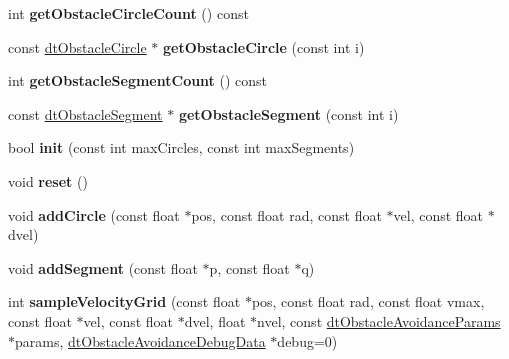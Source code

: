 \begin{DoxyCompactItemize}
\item 
\mbox{\label{classdtObstacleAvoidanceQuery_ae520788c1150ae9c0efa15ddee6b44a6}} 
int {\bfseries get\+Obstacle\+Circle\+Count} () const
\item 
\mbox{\label{classdtObstacleAvoidanceQuery_a2de5b7639831faa59a708b2ed3cd6f15}} 
const \hyperlink{structdtObstacleCircle}{dt\+Obstacle\+Circle} $\ast$ {\bfseries get\+Obstacle\+Circle} (const int i)
\item 
\mbox{\label{classdtObstacleAvoidanceQuery_a38c5fdba38e19e6c7481b75d089e45b6}} 
int {\bfseries get\+Obstacle\+Segment\+Count} () const
\item 
\mbox{\label{classdtObstacleAvoidanceQuery_a60779b0d519def7ae2101ad153266cd2}} 
const \hyperlink{structdtObstacleSegment}{dt\+Obstacle\+Segment} $\ast$ {\bfseries get\+Obstacle\+Segment} (const int i)
\item 
\mbox{\label{classdtObstacleAvoidanceQuery_a9f927e4f09b35473853be3bf7f28129a}} 
bool {\bfseries init} (const int max\+Circles, const int max\+Segments)
\item 
\mbox{\label{classdtObstacleAvoidanceQuery_a993c62548ead013ac1cb622c43c175ad}} 
void {\bfseries reset} ()
\item 
\mbox{\label{classdtObstacleAvoidanceQuery_aca861fb3e13b8785124b655b8313de45}} 
void {\bfseries add\+Circle} (const float $\ast$pos, const float rad, const float $\ast$vel, const float $\ast$dvel)
\item 
\mbox{\label{classdtObstacleAvoidanceQuery_ab0abab88b2cba7747e6ed38470ca6eff}} 
void {\bfseries add\+Segment} (const float $\ast$p, const float $\ast$q)
\item 
\mbox{\label{classdtObstacleAvoidanceQuery_a5209e8625a0618fd9c96ba2d0374d90f}} 
int {\bfseries sample\+Velocity\+Grid} (const float $\ast$pos, const float rad, const float vmax, const float $\ast$vel, const float $\ast$dvel, float $\ast$nvel, const \hyperlink{structdtObstacleAvoidanceParams}{dt\+Obstacle\+Avoidance\+Params} $\ast$params, \hyperlink{classdtObstacleAvoidanceDebugData}{dt\+Obstacle\+Avoidance\+Debug\+Data} $\ast$debug=0)

\end{DoxyCompactItemize}

